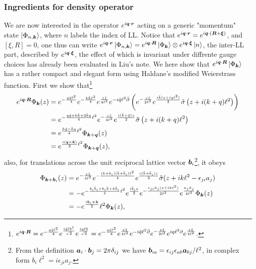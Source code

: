 \documentclass[%
nofootinbib,
 amsmath,amssymb,
 aps,onecolumn,
prb
]{revtex4-2}
\newcommand{\zz}{\bar{z}}
\newcommand{\tilsig}{\tilde{\sigma}}
\begin{document}
\subsubsection{Ingredients for density operator}
We are now interested in the operator $e^{i\vb*{q}\cdot\vb*{r}}$ acting on a generic "momentum" state $\ket{\Phi_{n,\vb*{k}}}$, where $n$ labels the index of LL. Notice that 
$e^{i\vb*{q}\cdot\vb*{r}}=e^{i\vb*{q}\cdot(\vb*{R}+\vb*{\xi})}$, and $[\xi,R]=0$, one thus can write $e^{i\vb*{q}\cdot\vb*{r}}\ket{\Phi_{n,\vb*{k}}}=e^{i\vb*{q}\cdot\vb*{R}}\ket{\Phi_{\vb*{k}}}\otimes e^{i\vb*{q}\cdot\vb*{\xi}}\ket{n}$,
the inter-LL part, described by $e^{i\vb*{q}\cdot\vb*{\xi}}$, the effect of which is invariant under 
diffrente gauge choices has already been evaluated in Liu's note. We here show that $e^{i\vb*{q}\cdot\vb*{R}}\ket{\Phi_{\vb*{k}}}$ has a rather compact and elegant form using Haldane's modified Weierstrass function. First we show that\footnote{$e^{i\vb*{q}\cdot\vb*{R}}=e^{-\frac{q\bar{q}\ell^2}{4}}e^{\frac{i\bar{q}\ell b^\dag}{\sqrt{2}}}e^{\frac{iq\ell b}{\sqrt{2}}}=e^{-\frac{q\bar{q}\ell^2}{4}}e^{\frac{z\zz}{4\ell^2}}e^{-i\bar{q}\ell^2\bar{\partial}}e^{-\frac{z\zz}{2\ell^2}}e^{iq\ell^2\partial}e^{\frac{z\zz}{4\ell^2}}$.}
\begin{align}\label{GuidingCentreAction}
    e^{i\vb*{q}\cdot\vb*{R}}\Phi_{\vb*{k}}(z)&=e^{-\frac{q\bar{q}\ell^2}{4}}e^{-\frac{k\bar{k}\ell^2}{4}}e^{\frac{z\bar{z}}{4\ell^2}}e^{-i\bar{q}\ell^2\bar{\partial}}\left(e^{-\frac{z\bar{z}}{2\ell^2}}e^{\frac{i\bar{k}(z+iq\ell^2)}{2}}\tilsig\left(z+i(k+q)\ell^2\right)\right) \nonumber\\ 
    &=e^{-\frac{q\bar{q}+k\bar{k}+2\bar{k}q}{4}\ell^2}e^{-\frac{z\bar{z}}{4\ell^2}}e^{\frac{i(\bar{k}+\bar{q})z}{2}}\tilsig\left(z+i(k+q)\ell^2\right)\nonumber\\ 
    &=e^{\frac{k\bar{q}-\bar{k}q}{4}\ell^2}\Phi_{\vb*{k}+\vb*{q}}(z)\nonumber\\ 
    &=e^{\frac{i(\vb*{q}\times\vb*{k})}{2}\ell^2}\Phi_{\vb*{k}+\vb*{q}}(z),
\end{align}
also, for translations across the unit reciprocal lattice vector $\vb*{b}_i$\footnote{From the definition $\vb*{a}_i\cdot\vb*{b}_j=2\pi\delta_{ij}$ we have $\vb*{b}_{ia}=\epsilon_{ij}\epsilon_{ab}\vb*{a}_{bj}/\ell^2$, in complex form $b_i\ell^2=i\epsilon_{ji}a_j$.}, it obeys 
\begin{align}\label{StateTransRecip}
    \Phi_{\vb*{k}+\vb*{b}_i}(z)&=e^{-\frac{z\zz}{4\ell^2}}e^{-\frac{(k+b_i)(\bar{k}+\bar{b}_i)\ell^2}{4}}e^{\frac{i(\bar{k}+\bar{b}_i)z}{2}}\tilsig(z+ik\ell^2-\epsilon_{ji}a_j)\nonumber\\ 
    &=-e^{-\frac{b_i\bar{b}_i+b_i\bar{k}+k\bar{b}_i}{4}\ell^2}e^{\frac{i\bar{b}_i z}{2}}e^{-\frac{\epsilon_{ji}\bar{a}_j(z+ik\ell^2)}{2\ell^2}}e^{\frac{a_j\bar{a}_j}{4\ell^2}}\Phi_{\vb*{k}}(z)\nonumber\\ 
    &=-e^{\frac{i\vb*{b}_i\times\vb*{k}}{2}}\ell^2\Phi_{\vb*{k}}(z),
\end{align}
\end{document}
